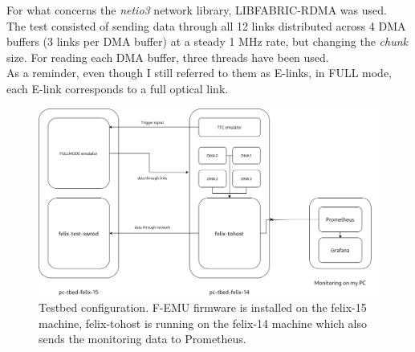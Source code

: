 For what concerns the \emph{netio3} network library, LIBFABRIC-RDMA was used.\\
The test consisted of sending data through all 12 links distributed across 4 \acs{DMA} buffers (3 links per \acs{DMA} buffer) at a steady 1 MHz rate, but changing the \emph{chunk} size. For reading each DMA buffer, three threads have been used.\\
As a reminder, even though I still referred to them as \acs{E-link}s, in FULL mode, each \acs{E-link} corresponds to a full optical link.

\begin{figure}[htbp]
\centering
\includegraphics[width=\textwidth]{images/results/tohost-tbed-setup.png}
\caption[Testbed configuration]{Testbed configuration. F-EMU firmware is installed on the felix-15 machine, felix-tohost is running on the felix-14 machine which also sends the monitoring data to Prometheus.}
\label{fig:tbed-setup}
\end{figure}

